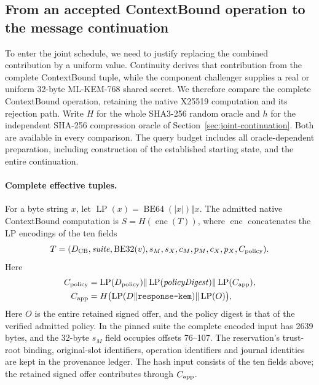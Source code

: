 \subsection{From an accepted ContextBound operation to the message continuation}
\label{sec:contextbound-connection}

To enter the joint schedule, we need to justify replacing the combined
contribution by a uniform value. Continuity derives that contribution
from the complete ContextBound tuple, while
the component challenger supplies a real or uniform 32-byte ML-KEM-768
shared secret. We therefore compare the complete ContextBound operation,
retaining the native X25519 computation and its rejection path.
Write $H$ for the whole SHA3-256 random oracle and $h$ for
the independent SHA-256 compression oracle of
Section~\ref{sec:joint-continuation}. Both are available in every
comparison. The query budget includes all oracle-dependent preparation,
including construction of the established starting state, and the
entire continuation.

\paragraph{Complete effective tuples.}
For a byte string $x$, let
$\operatorname{LP}(x)=\operatorname{BE64}(|x|)\Vert x$.
The admitted native ContextBound computation is $S=H(\operatorname{enc}(T))$,
where $\operatorname{enc}$ concatenates the LP encodings of the ten fields
\[
 T=(D_{\rm CB},\mathit{suite},\operatorname{BE32}(v),
 s_M,s_X,c_M,p_M,c_X,p_X,C_{\rm policy}).
\]
Here
\[
\begin{aligned}
 C_{\rm policy}
 &=\operatorname{LP}(D_{\rm policy})
   \Vert\operatorname{LP}(\mathit{policyDigest})
   \Vert\operatorname{LP}(C_{\rm app}),\\
 C_{\rm app}
 &=H\bigl(\operatorname{LP}(D\Vert\texttt{response-kem})
                \Vert\operatorname{LP}(O)\bigr),
\end{aligned}
\]
Here $O$ is the entire retained signed offer, and the policy digest is that of
the verified admitted policy. In the pinned suite the complete encoded input
has 2639 bytes, and the 32-byte $s_M$ field occupies offsets 76--107.
The reservation's trust-root binding, original-slot identifiers, operation
identifiers and journal identities are kept in the provenance ledger.
The hash input consists of the ten fields above; the retained signed offer
contributes through $C_{\rm app}$.

